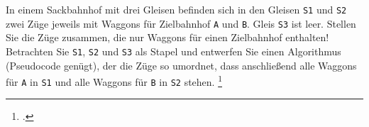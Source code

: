 \documentclass{bschlangaul-aufgabe}
\begin{document}

In einem Sackbahnhof mit drei Gleisen befinden sich in den Gleisen
\texttt{S1} und \texttt{S2} zwei Züge jeweils mit Waggons für
Zielbahnhof \texttt{A} und \texttt{B}. Gleis \texttt{S3} ist leer.
Stellen Sie die Züge zusammen, die nur Waggons für einen Zielbahnhof
enthalten! Betrachten Sie \texttt{S1}, \texttt{S2} und \texttt{S3} als
Stapel und entwerfen Sie einen Algorithmus (Pseudocode genügt), der die
Züge so umordnet, dass anschließend alle Waggons für \texttt{A} in
\texttt{S1} und alle Waggons für \texttt{B} in \texttt{S2} stehen.
\footcite[Seite 3, Aufgabe 4: Stack]{aud:ab:7}
\end{document}
